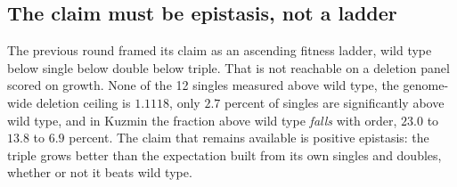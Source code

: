 \subsection{The claim must be epistasis, not a ladder}

The previous round framed its claim as an ascending fitness ladder, wild type
below single below double below triple. That is not reachable on a deletion panel
scored on growth. None of the 12 singles measured above wild type, the
genome-wide deletion ceiling is $1.1118$, only $2.7$ percent of singles are
significantly above wild type, and in Kuzmin the fraction above wild type
\emph{falls} with order, $23.0$ to $13.8$ to $6.9$ percent. The claim that
remains available is positive epistasis: the triple grows better than the
expectation built from its own singles and doubles, whether or not it beats wild
type.
